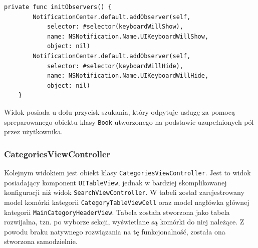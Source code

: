 \documentclass[twoside]{projektInzynierskiMS}
\begin{document}
\begin{verbatim}
private func initObservers() {
        NotificationCenter.default.addObserver(self,
            selector: #selector(keyboardWillShow),
            name: NSNotification.Name.UIKeyboardWillShow,
            object: nil)
        NotificationCenter.default.addObserver(self,
            selector: #selector(keyboardWillHide),
            name: NSNotification.Name.UIKeyboardWillHide,
            object: nil)
    }
\end{verbatim}

Widok posiada u dołu przycisk szukania, który odpytuje usługę za pomocą spreparowanego obiektu klasy \verb`Book` utworzonego na podstawie uzupełnionych pól przez użytkownika.


\subsubsection{CategoriesViewController}

Kolejnym widokiem jest obiekt klasy \verb`CategoriesViewController`. Jest to widok posiadający komponent \verb`UITableView`, jednak w bardziej skomplikowanej konfiguracji niż widok \verb`SearchViewController`. W tabeli został zarejestrowany model komórki kategorii \verb`CategoryTableViewCell` oraz model nagłówka głównej kategorii \verb`MainCategoryHeaderView`. Tabela została stworzona jako tabela rozwijalna, tzn. po wyborze sekcji, wyświetlane są komórki do niej należące. Z powodu braku natywnego rozwiązania na tę funkcjonalność, została ona stworzona samodzielnie.
\end{document}

